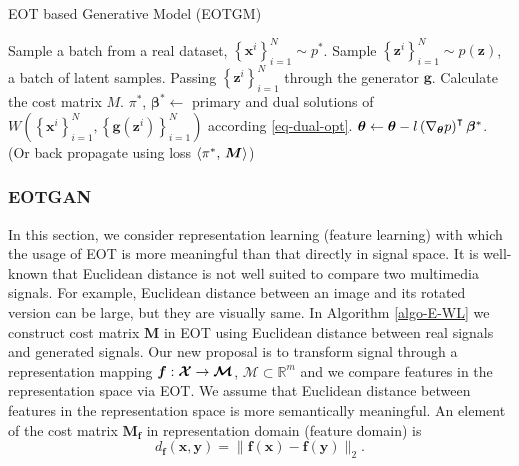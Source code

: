 \begin{algorithm}[!t]
  \caption{EOT based Generative Model (EOTGM)}\label{algo-E-WL}
  \begin{algorithmic}[1]
    \STATE Sample  a batch from a real dataset, $\left\{ \bm{x}^{i} \right\}_{i=1}^{N} \sim p^{\ast}$. 
    \STATE Sample $\left\{ \bm{z}^{i} \right\}_{i=1}^{N} \sim p(\bm{z})$, a batch of latent samples.
    \STATE Passing $\left\{ \bm{z}^{i} \right\}_{i=1}^{N}$ through the generator $\bm{g}$.
    \STATE Calculate the cost matrix $M$.
    \STATE $\pi^{\ast}$, $\bm{\beta}^{\ast} \gets$ primary and dual
    solutions of $W(\left\{ \bm{x}^{i} \right\}_{i=1}^{N}, \left\{
      \bm{g}(\bm{z}^{i})\right\}_{i=1}^{N})$ according \eqref{eq-dual-opt}.
    \STATE $\bm{\theta} \gets \bm{\theta} - l \left(\nabla_{\bm{\theta}}{p}\right)^{\intercal}
    \bm{\beta}^{\ast}$. (Or back propagate using loss $\langle \pi^{\ast},\,\bm{M}\rangle$)
    \ENDWHILE
  \end{algorithmic}
\end{algorithm}

\subsubsection{EOTGAN}

In this section, we consider representation learning (feature
learning) with which the usage of EOT is more meaningful than that
directly in signal space.
It is well-known that Euclidean distance is not well suited to compare
two multimedia signals. For example, Euclidean distance between an
image and its rotated version can be large, but they are visually same. In Algorithm \ref{algo-E-WL} we construct cost matrix $\bm{M}$ in EOT using 
Euclidean distance between real signals and generated signals. Our new proposal is to transform signal through a representation mapping 
$\bm{f}: \bm{\mathcal{X}} \rightarrow \bm{\mathcal{M}}$, $\bm{\mathcal{M}}\subset\mathbb{R}^{m}$ and we compare features in the representation space via EOT. We assume that Euclidean distance
between features in the representation space is more semantically
meaningful. An element of the cost matrix $\bm{M_f}$ in representation domain (feature domain) is
\begin{equation}\label{def-similarity}
  d_{\bm{f}}(\bm{x}, \bm{y}) = \|\bm{f}(\bm{x})-\bm{f}(\bm{y})\|_{2}.
\end{equation}

